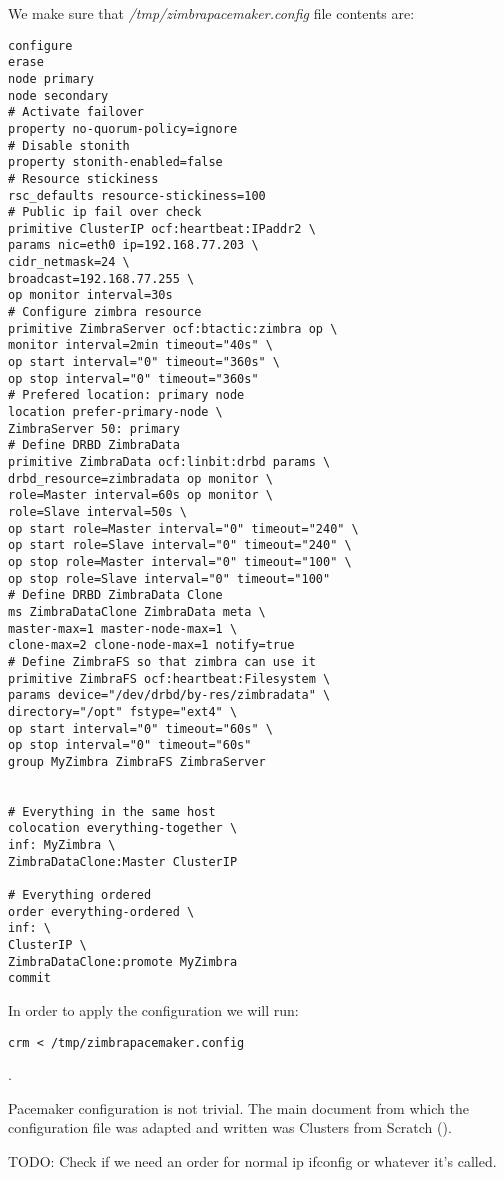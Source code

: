 We make sure that \textit{/tmp/zimbrapacemaker.config} file contents are:
\begin{verbatim}
configure
erase
node primary
node secondary
# Activate failover
property no-quorum-policy=ignore
# Disable stonith
property stonith-enabled=false
# Resource stickiness
rsc_defaults resource-stickiness=100
# Public ip fail over check
primitive ClusterIP ocf:heartbeat:IPaddr2 \
params nic=eth0 ip=192.168.77.203 \
cidr_netmask=24 \
broadcast=192.168.77.255 \
op monitor interval=30s
# Configure zimbra resource
primitive ZimbraServer ocf:btactic:zimbra op \
monitor interval=2min timeout="40s" \
op start interval="0" timeout="360s" \
op stop interval="0" timeout="360s"
# Prefered location: primary node
location prefer-primary-node \
ZimbraServer 50: primary
# Define DRBD ZimbraData
primitive ZimbraData ocf:linbit:drbd params \
drbd_resource=zimbradata op monitor \
role=Master interval=60s op monitor \
role=Slave interval=50s \
op start role=Master interval="0" timeout="240" \
op start role=Slave interval="0" timeout="240" \
op stop role=Master interval="0" timeout="100" \
op stop role=Slave interval="0" timeout="100"
# Define DRBD ZimbraData Clone
ms ZimbraDataClone ZimbraData meta \
master-max=1 master-node-max=1 \
clone-max=2 clone-node-max=1 notify=true
# Define ZimbraFS so that zimbra can use it
primitive ZimbraFS ocf:heartbeat:Filesystem \
params device="/dev/drbd/by-res/zimbradata" \
directory="/opt" fstype="ext4" \
op start interval="0" timeout="60s" \
op stop interval="0" timeout="60s"
group MyZimbra ZimbraFS ZimbraServer


# Everything in the same host
colocation everything-together \
inf: MyZimbra \
ZimbraDataClone:Master ClusterIP

# Everything ordered
order everything-ordered \
inf: \
ClusterIP \
ZimbraDataClone:promote MyZimbra
commit
\end{verbatim}

In order to apply the configuration we will run:
\begin{verbatim}
crm < /tmp/zimbrapacemaker.config
\end{verbatim}
.



Pacemaker configuration is not trivial. The main document from which the configuration file was adapted and written was Clusters from Scratch (\cite{ClustersFromScratch}).

TODO: Check if we need an order for normal ip ifconfig or whatever it's called.

